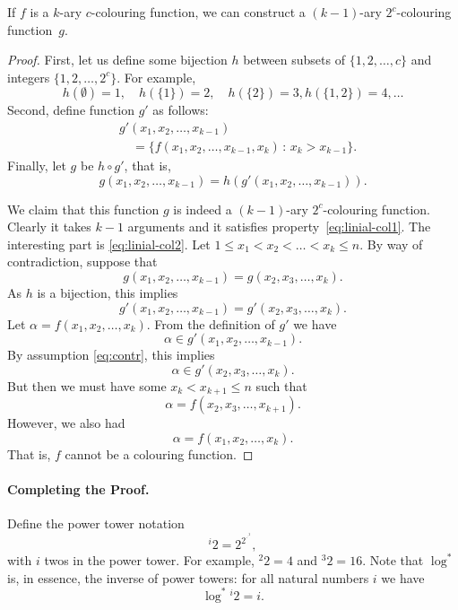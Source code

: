\begin{lemma}\label{lem:linial-iter}
    If $f$ is a $k$-ary $c$-colouring function, we can construct a $(k-1)$-ary $2^c$-colouring function~$g$.
\end{lemma}
\begin{proof}
    First, let us define some bijection $h$ between subsets of $\{1,2,\dotsc,c\}$ and integers $\{1,2,\dotsc,2^c\}$. For example,
    \[
        h(\emptyset) = 1,\quad h(\{1\}) = 2,\quad h(\{2\}) = 3, h(\{1,2\}) = 4, \dotsc
    \]
    Second, define function $g'$ as follows:
    \[
    \begin{split}
        &g'(x_1, x_2, \dotsc, x_{k-1}) \\
        &\quad= \bigl\{ f(x_1, x_2, \dotsc, x_{k-1}, x_k) \,:\, x_k > x_{k-1} \bigr\}.
    \end{split}
    \]
    Finally, let $g$ be $h \circ g'$, that is,
    \[
        g(x_1, x_2, \dotsc, x_{k-1}) = h(g'(x_1, x_2, \dotsc, x_{k-1})).
    \]

    We claim that this function $g$ is indeed a $(k-1)$-ary $2^c$-colouring function. Clearly it takes $k-1$ arguments and it satisfies property~\eqref{eq:linial-col1}. The interesting part is \eqref{eq:linial-col2}. Let $1 \le x_1 < x_2 < \dotso < x_k \le n$. By way of contradiction, suppose that
    \[
        g(x_1, x_2, \dotsc, x_{k-1}) = g(x_2, x_3, \dotsc, x_k).
    \]
    As $h$ is a bijection, this implies
    \begin{equation}
        g'(x_1, x_2, \dotsc, x_{k-1}) = g'(x_2, x_3, \dotsc, x_k). \label{eq:contr}
    \end{equation}
    Let $\alpha = f(x_1, x_2, \dotsc, x_k)$.
    From the definition of $g'$ we have
    \[
        \alpha \in g'(x_1, x_2, \dotsc, x_{k-1}).
    \]
    By assumption \eqref{eq:contr}, this implies
    \[
        \alpha \in g'(x_2, x_3, \dotsc, x_k).
    \]
    But then we must have some $x_k < x_{k+1} \le n$ such that
    \[
        \alpha = f(x_2, x_3, \dotsc, x_{k+1}).
    \]
    However, we also had
    \[
        \alpha = f(x_1, x_2, \dotsc, x_k).
    \]
    That is, $f$ cannot be a colouring function.
\end{proof}


\paragraph{Completing the Proof.}

Define the power tower notation
\[
    {}^i 2 = 2^{2^{\cdot^{\cdot^2}}},
\]
with $i$ twos in the power tower. For example, ${}^2 2 = 4$ and ${}^3 2 = 16$. Note that $\log^*$ is, in essence, the inverse of power towers: for all natural numbers $i$ we have
\[
    \log^* {}^i 2 = i.
\]

